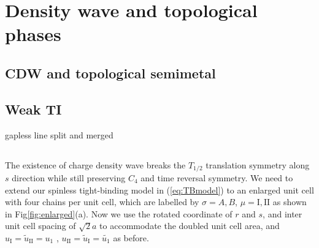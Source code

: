   \chapter{Density wave and topological phases}
\section{ CDW and topological semimetal}
\section{Weak TI}

gapless line split and merged



\section{}
The existence of charge density wave breaks the $T_{1/2}$ translation symmetry along $s$ direction while still preserving $C_4$ and time reversal symmetry. We need to extend our spinless tight-binding model in (\ref{eq:TBmodel}) to an enlarged unit cell with four chains per unit cell, which are labelled by $\sigma = A, B$, $\mu = \mathrm{I}, \mathrm{II}$ as shown in Fig\ref{fig:enlarged}(a). 
Now we use the rotated coordinate of $r$ and $s$, and inter unit cell spacing of $\sqrt{2} a$ to accommodate the doubled unit cell area, and $u_\mathrm{I} = \tilde{u}_\mathrm{II} = u_1$ , $u_\mathrm{II} = \tilde{u}_\mathrm{I} = \tilde{u_1}$ as before. 

